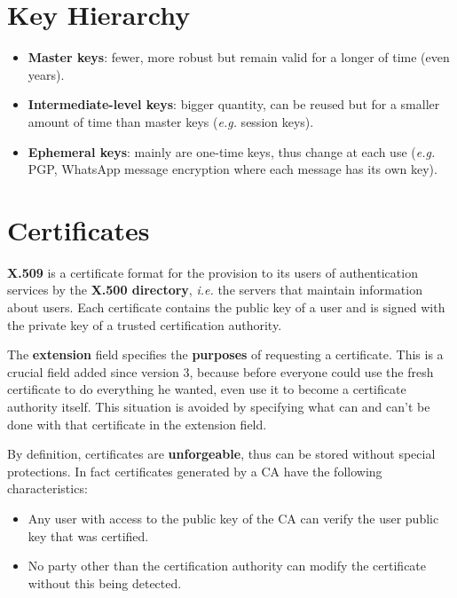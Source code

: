 \documentclass[oneside]{academica}
\begin{document}
\section{Key Hierarchy}

\begin{itemize}
  \item \textbf{Master keys}: fewer, more robust but remain valid for a longer of time (even years).
  \item \textbf{Intermediate-level keys}: bigger quantity, can be reused but for a smaller amount of time than master keys (\textit{e.g.} session keys).
  \item \textbf{Ephemeral keys}: mainly are one-time keys, thus change at each use (\textit{e.g.} PGP, WhatsApp message encryption where each message has its own key).
\end{itemize}

\section{Certificates}

\textbf{X.509} is a certificate format for the provision to its users of authentication services by the \textbf{X.500 directory}, \textit{i.e.} the servers that maintain information about users.
Each certificate contains the public key of a user and is signed with the private key of a trusted certification authority.

The \textbf{extension} field specifies the \textbf{purposes} of requesting a certificate.
This is a crucial field added since version 3, because before everyone could use the fresh certificate to do everything he wanted, even use it to become a certificate authority itself.
This situation is avoided by specifying what can and can't be done with that certificate in the extension field.

By definition, certificates are \textbf{unforgeable}, thus can be stored without special protections.
In fact certificates generated by a CA have the following characteristics: 
\begin{itemize}
  \item Any user with access to the public key of the CA can verify the user public key that was certified.
  \item No party other than the certification authority can modify the certificate without this being detected.
\end{itemize}
\end{document}
